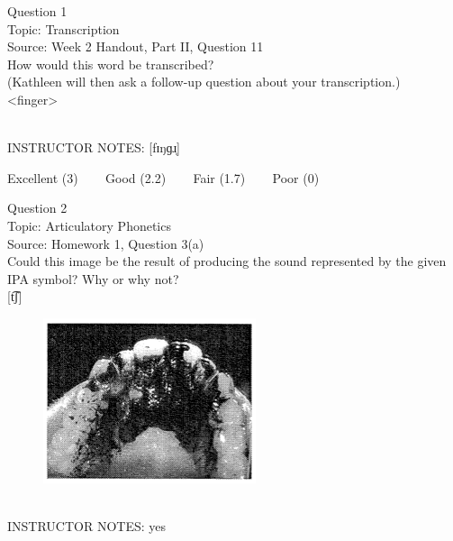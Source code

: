 \documentclass[12pt]{article}
\begin{document}
\begin{center}
\textbf{{\color{blue}{\HUGE START OF EXAM\\}}}

\textbf{{\color{blue}{\HUGE Student ID: 71994\\}}}

\textbf{{\color{blue}{\HUGE \\}}}

\end{center}
\newpage

{\large Question 1}\\

Topic: Transcription\\
Source: Week 2 Handout, Part II, Question 11\\

How would this word be transcribed?\\ (Kathleen will then ask a follow-up question about your transcription.)\\

<finger>


~\\
INSTRUCTOR NOTES: [fɪŋɡɹ̩]


\vfill
Excellent (3) ~~~ Good (2.2) ~~~ Fair (1.7) ~~~ Poor (0)
\newpage

{\large Question 2}\\

Topic: Articulatory Phonetics\\
Source: Homework 1, Question 3(a)\\

Could this image be the result of producing the sound represented by the given IPA symbol? Why or why not?\\

{[t͡ʃ]}

\begin{figure}[H]
\includegraphics{../images/staticpalatography_stop.png}
\end{figure}

~\\
INSTRUCTOR NOTES: yes
\end{document}
